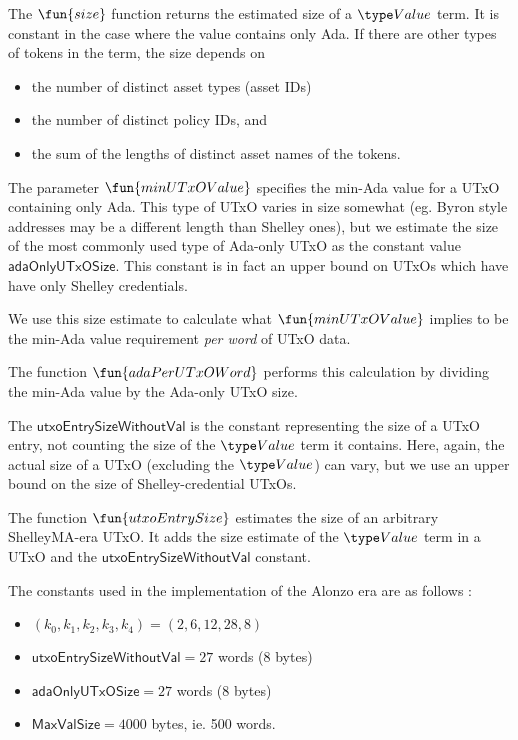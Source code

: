 The $\fun{size}$ function returns the estimated size of a $\Value$ term. It is constant in the
case where the value contains only Ada. If there are other types of tokens in the
term, the size depends on

\begin{itemize}
  \item the number of distinct asset types (asset IDs)
  \item the number of distinct policy IDs, and
  \item the sum of the lengths of distinct asset names of the tokens.
\end{itemize}

The parameter $\fun{minUTxOValue}$ specifies the min-Ada value for a UTxO containing
only Ada. This type of UTxO varies in size somewhat (eg. Byron style addresses
may be a different length than Shelley ones), but we estimate the size of the most commonly
used type of Ada-only UTxO as the constant value $\mathsf{adaOnlyUTxOSize}$.
This constant is in fact an upper bound on UTxOs which have have only Shelley credentials.

We use this size estimate
to calculate what $\fun{minUTxOValue}$ implies to be the min-Ada value requirement
\emph{per word} of UTxO data.

The function $\fun{adaPerUTxOWord}$ performs this calculation by dividing the
min-Ada value by the Ada-only UTxO size.

The $\mathsf{utxoEntrySizeWithoutVal}$ is the constant representing
the size of a UTxO entry, not counting the size of the $\Value$ term it contains.
Here, again, the actual size of a UTxO (excluding the $\Value$) can vary, but
we use an upper bound on the size of Shelley-credential UTxOs.

The function $\fun{utxoEntrySize}$ estimates the size of an arbitrary ShelleyMA-era
UTxO. It adds the size estimate of the $\Value$ term in a UTxO and the
$\mathsf{utxoEntrySizeWithoutVal}$ constant.

The constants used in the implementation of the Alonzo era are as follows :

\begin{itemize}
  \item $(k_0, k_1, k_2, k_3, k_4) = (2, 6, 12, 28, 8)$
  \item $\mathsf{utxoEntrySizeWithoutVal} = 27$ words (8 bytes)
  \item $\mathsf{adaOnlyUTxOSize} = 27$ words (8 bytes)
  \item $\mathsf{MaxValSize} = 4000$ bytes, ie. 500 words.
\end{itemize}
